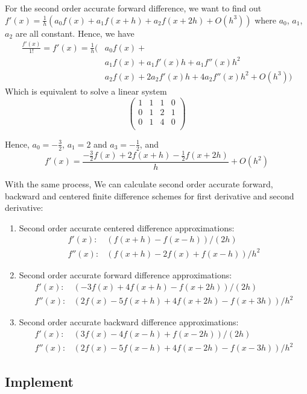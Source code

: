 \documentclass[
	12pt, %
]{fphw}
\begin{document}
For the second order accurate forward difference, 
we want to find out $f'(x)=\frac{1}{h}(a_0f(x)+a_1f(x+h)+a_2f(x+2h)+O(h^3))$ 
where $a_0$, $a_1$, $a_2$ are all constant.
Hence, we have
\[
\begin{aligned}
\frac{f'(x)}{1 !} = f'(x)= \frac{1}{h}(&a_0 f(x)+\\
& a_1 f(x)+a_1 f'(x) h+a_1 f''(x) h^2 \\
&a_2 f(x)+2 a_2 f'(x) h+4 a_2 f''(x) h^2 + O(h^3))
\end{aligned}
\]
Which is equivalent to solve a linear system
\[
\left(
	\begin{array}{ccc|c}
	1 & 1 & 1 & 0 \\
	0 & 1 & 2 & 1 \\
	0 & 1 & 4 & 0 \\
	\end{array}
\right)
\]

Hence, $a_0 = -\frac{3}{2}$, $a_1=2$ and $a_3 = -\frac{1}{2}$, and 
\[f' (x)=\frac{-\frac{3}{2}f (x)+2f (x+h) -\frac{1}{2}f (x+2h)}{h}+O(h^2)\]

With the same process, We can calculate second order accurate forward, backward and centered finite difference
schemes for first derivative and second derivative:
\begin{enumerate}
\item Second order accurate centered difference approximations:
\[
\begin{aligned}
f' (x): & (f (x+h)-f (x-h)) /(2 h) \\
f'' (x): & (f (x+h)-2 f (x)+f (x-h)) / h^2
\end{aligned}
\]
\item Second order accurate forward difference approximations:
\[
\begin{aligned}
f' (x): & (-3 f (x)+4 f (x+h)-f (x+2 h)) / (2 h) \\
f'' (x): & (2 f (x)-5 f (x+h)+4 f (x+2 h)-f (x+3 h)) / h^2
\end{aligned}
\]
\item Second order accurate backward difference approximations:
\[
\begin{aligned}
f' (x): & (3 f (x)-4 f (x-h)+f (x-2 h)) / (2 h) \\
f'' (x): & (2 f (x)-5 f (x-h)+4 f (x-2 h)-f (x-3 h)) / h^2
\end{aligned}
\]
\end{enumerate}

\subsection*{Implement}
\end{document}
